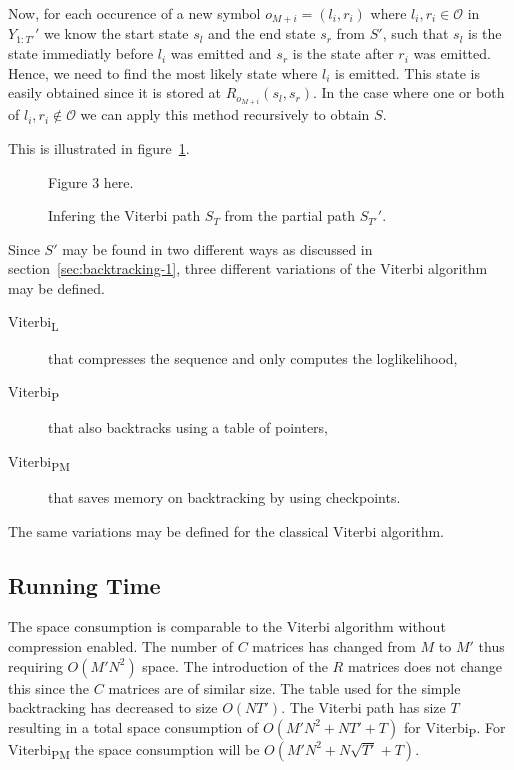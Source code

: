 Now, for each occurence of a new symbol $o_{M + i} = (l_i, r_i)$ where
$l_i, r_i \in \mathcal{O}$ in $Y_{1:T'}'$ we know the start state $s_l$ and the
end state $s_r$ from $S'$, such that $s_l$ is the state immediatly before $l_i$
was emitted and $s_r$ is the state after $r_i$ was emitted. Hence, we need to
find the most likely state where $l_i$ is emitted. This state is easily
obtained since it is stored at $R_{o_{M + i}}(s_l, s_r)$. In the case where one
or both of $l_i, r_i \not \in \mathcal{O}$ we can apply this method
recursively to obtain $S$.

This is illustrated in figure~\ref{fig:infering-viterbi-path}.

\begin{figure}
  \centering
  Figure 3 here.
  \caption{Infering the Viterbi path $S_T$ from the partial path $S_{T'}'$.}
  \label{fig:infering-viterbi-path}
\end{figure}

Since $S'$ may be found in two different ways as discussed in
section~\ref{sec:backtracking-1}, three different variations of the Viterbi
algorithm may be defined.
\begin{description}
\item[Viterbi\textsubscript{L}] that compresses the sequence and only computes the
  loglikelihood,
\item[Viterbi\textsubscript{P}] that also backtracks using a table of pointers,
\item[Viterbi\textsubscript{PM}] that saves memory on backtracking by using checkpoints.
\end{description}
The same variations may be defined for the classical Viterbi algorithm.

\subsection{Running Time}
\label{sec:running-time}

The space consumption is comparable to the Viterbi algorithm without
compression enabled. The number of $C$ matrices has changed from $M$ to $M'$
thus requiring $O\left(M' N^2\right)$ space. The introduction of the $R$ matrices does not
change this since the $C$ matrices are of similar size. The table used for the
simple backtracking has decreased to size $O\left(N T'\right)$. The Viterbi path has size
$T$ resulting in a total space consumption of $O\left(M' N^2 + N T' + T\right)$ for
Viterbi\textsubscript{P}. For Viterbi\textsubscript{PM} the space consumption will be
$O\left(M' N^2 + N \sqrt{T'} + T\right)$.

